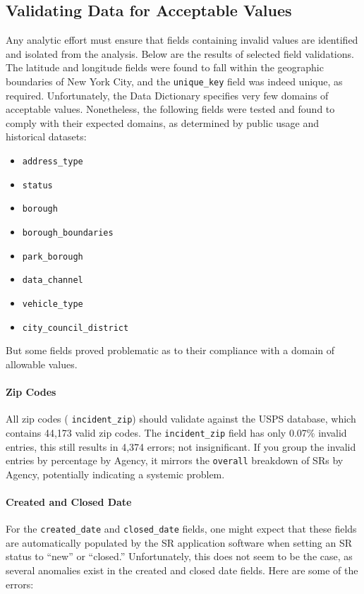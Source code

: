 \documentclass[linenumber]{jdsart}
\begin{document}
\subsection{Validating Data for Acceptable Values}
\label{sec:domain}
Any analytic effort must ensure that fields containing invalid values 
are identified and isolated from the analysis. Below are the results of 
selected field validations. The latitude and longitude fields were 
found to fall within the geographic boundaries of New York City, and 
the \texttt{unique\_key} field was indeed unique, as required. 
Unfortunately, the Data Dictionary specifies very few domains of 
acceptable values. Nonetheless, the following fields were tested and found 
to comply with their expected domains, as determined by public usage 
and historical datasets:

\begin{itemize}
    \item \texttt{address\_type}
    \item \texttt{status}
    \item \texttt{borough}
    \item \texttt{borough\_boundaries}
    \item \texttt{park\_borough}
    \item \texttt{data\_channel}
    \item \texttt{vehicle\_type}
    \item \texttt{city\_council\_district}
\end{itemize}

But some fields proved problematic as to their 
compliance with a domain of allowable values. 


\paragraph{Zip Codes}
\label{sec:zipcodesissues}
All zip codes ( \texttt{incident\_zip}) 
should validate against the USPS database, which contains 
44,173 valid zip codes. The \texttt{incident\_zip} field has 
only 0.07\% invalid entries, this still results in 4,374 errors; 
not insignificant. If you group the invalid entries by 
percentage by Agency, it mirrors the \texttt{overall} 
breakdown of SRs by Agency, potentially 
indicating a systemic problem.


\paragraph{Created and Closed Date}
\label{sec:negativeduration}
For the \texttt{created\_date} and \texttt{closed\_date} fields, one 
might expect that these fields are automatically populated by the SR 
application software when setting an SR status to ``new'' or ``closed.'' 
Unfortunately, this does not seem to be the case, as several anomalies 
exist in the created and closed date fields. Here are some of the errors:
\end{document}
